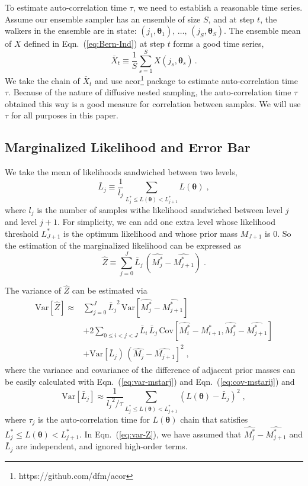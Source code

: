 \documentclass[letterpaper, preprint]{aastex}
\newcommand{\bth} {\boldsymbol \theta}
\newcommand{\var}{\mathrm{Var}}
\newcommand{\cov}{\mathrm{Cov}}
\begin{document}
To estimate auto-correlation time $\tau$, we need to establish a reasonable time series. Assume our ensemble sampler has an ensemble of size $S$, and at step $t$, the walkers in the ensemble are in state: $(j_1,\bth_1),\,\ldots,\,(j_S,\bth_S)$. The ensemble mean of $X$ defined in Eqn.~(\ref{eq:Bern-Ind}) at step $t$ forms a good time series,
\begin{equation}
\bar{X}_t \equiv \frac{1}{S}\sum_{s=1}^S X({j_s}, \bth_s)\, .
\end{equation}
We take the chain of $\bar{X}_t$ and use {\text acor}\footnote{https://github.com/dfm/acor} package to estimate auto-correlation time $\tau$. Because of the nature of diffusive nested sampling, the auto-correlation time $\tau$ obtained this way is a good measure for correlation between samples. We will use $\tau$ for all purposes in this paper.

\subsection{Marginalized Likelihood and Error Bar}
\label{sec:computing-evidence}
We take the mean of likelihoods sandwiched between two levels,
\begin{equation}
\bar{L}_j \equiv  \frac{1}{l_j}\sum_{L_j^*\leq L(\bth)<L_{j+1}^*} L(\bth)\; ,
\end{equation}
where $l_j$ is the number of samples withe likelihood sandwiched between level $j$ and level $j+1$. For simplicity, we can add one extra level whose likelihood threshold $L^*_{J+1}$ is the optimum likelihood and whose prior mass $M_{J+1}$ is 0. So the estimation of the marginalized likelihood can be expressed as
\begin{equation}
\widehat{Z} \equiv \sum_{j=0}^{J} \bar{L}_j \, \left(\widehat{M^*_j} - \widehat{M^*_{j+1}}\right)\; .
\label{eq:estimator-Z}
\end{equation}

The variance of $\widehat{Z}$ can be estimated via
\begin{align}
\var \left[\widehat{Z}\right] \approx & \sum_{j=0}^{J} {\bar{L}_j}^{2} \, \var \left[\widehat{M^*_j} - \widehat{M^*_{j+1}}\right] \nonumber \\
& + 2 \sum_{0\leq i < j < J}\bar{L}_i\, \bar{L}_j \, \cov \left[ {\widehat{M^*_i} - \widehat{M^*_{i+1}}},  {\widehat{M^*_j} - \widehat{M^*_{j+1}}} \right] \nonumber \\
&+ \var \left[\bar{L}_j\right)\, \left(\widehat{M_j} - \widehat{M_{j+1}}\right]^2\; ,
\label{eq:var-Z}
\end{align}
where the variance and covariance of the difference of adjacent prior masses can be easily calculated with Eqn.~(\ref{eq:var-mstarj}) and Eqn.~(\ref{eq:cov-mstarij}) and
\begin{equation}
\var \left[\bar{L}_j\right] \approx \frac{1}{{l_j}^2/\tau}\sum_{L_j^*\leq L(\bth)<L_{j+1}^*} \left(L(\bth)-\bar{L}_j\right)^2\; ,
\end{equation}
where $\tau_j$ is the auto-correlation time for $L(\bth)$ chain that satisfies $L_j^*\leq L(\bth)<L_{j+1}^*$. In Eqn.~(\ref{eq:var-Z}), we have assumed that $\widehat{M^*_j} - \widehat{M^*_{j+1}}$ and $\bar{L}_j$ are independent, and ignored high-order terms. 
\end{document}
